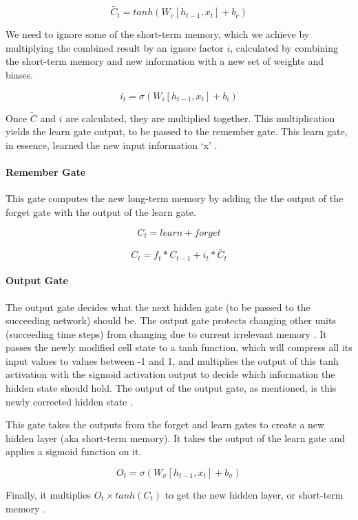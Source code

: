 \documentclass[10pt,twocolumn]{article}
\begin{document}
\[
\tilde{C_t} = tanh(W_c[h_{t-1}, x_t] + b_c)
\]

We need to ignore some of the short-term memory, which we achieve by multiplying the combined result by an ignore factor $i$, calculated by combining the short-term memory and new information with a new set of weights and biases.

\[
i_t = \sigma(W_i[h_{t-1}, x_t] + b_i)
\]

Once $\tilde{C}$ and $i$ are calculated, they are multiplied together. This multiplication yields the learn gate output, to be passed to the remember gate. This learn gate, in essence, learned the new input information `x' \cite{HowLSTMsWork}.


\paragraph{Remember Gate}

This gate computes the new long-term memory by adding the the output of the forget gate with the output of the learn gate.

\[
C_t = learn + forget
\]

\[
C_t = f_t * C_{t-1} + i_t * \tilde{C_t}
\]

\paragraph{Output Gate}

The output gate decides what the next hidden gate (to be passed to the succeeding network) should be. The output gate protects changing other units (succeeding time steps) from changing due to current irrelevant memory \cite{GentleIntroductionToLSTMNetworks}. It passes the newly modified cell state to a tanh function, which will compress all its input values to values between -1 and 1, and multiplies the output of this tanh activation with the sigmoid activation output to decide which information the hidden state should hold. The output of the output gate, as mentioned, is this newly corrected hidden state \cite{IllustratedGuideToLSTMs}.

This gate takes the outputs from the forget and learn gates to create a new hidden layer (aka short-term memory). It takes the output of the learn gate and applies a sigmoid function on it.

\[
O_t = \sigma(W_{\sigma}[h_{t-1}, x_t] + b_{\sigma})
\]

Finally, it multiplies $O_t \times tanh(C_t)$ to get the new hidden layer, or short-term memory \cite{UsingLSTMInStockPricePrediction}.
\end{document}
